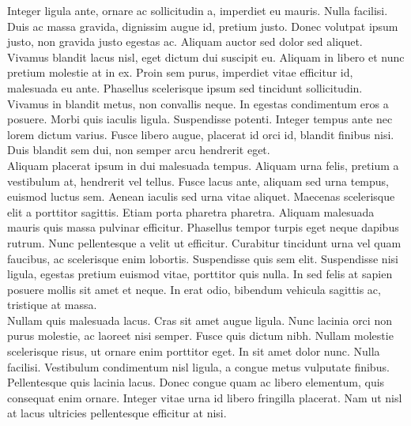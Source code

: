 Integer ligula ante, ornare ac sollicitudin a, imperdiet eu mauris. Nulla facilisi. Duis ac massa gravida, dignissim augue id, pretium justo. Donec volutpat ipsum justo, non gravida justo egestas ac. Aliquam auctor sed dolor sed aliquet. Vivamus blandit lacus nisl, eget dictum dui suscipit eu. Aliquam in libero et nunc pretium molestie at in ex. Proin sem purus, imperdiet vitae efficitur id, malesuada eu ante. Phasellus scelerisque ipsum sed tincidunt sollicitudin. Vivamus in blandit metus, non convallis neque. In egestas condimentum eros a posuere. Morbi quis iaculis ligula. Suspendisse potenti. Integer tempus ante nec lorem dictum varius. Fusce libero augue, placerat id orci id, blandit finibus nisi. Duis blandit sem dui, non semper arcu hendrerit eget. \\

Aliquam placerat ipsum in dui malesuada tempus. Aliquam urna felis, pretium a vestibulum at, hendrerit vel tellus. Fusce lacus ante, aliquam sed urna tempus, euismod luctus sem. Aenean iaculis sed urna vitae aliquet. Maecenas scelerisque elit a porttitor sagittis. Etiam porta pharetra pharetra. Aliquam malesuada mauris quis massa pulvinar efficitur. Phasellus tempor turpis eget neque dapibus rutrum. Nunc pellentesque a velit ut efficitur. Curabitur tincidunt urna vel quam faucibus, ac scelerisque enim lobortis. Suspendisse quis sem elit. Suspendisse nisi ligula, egestas pretium euismod vitae, porttitor quis nulla. In sed felis at sapien posuere mollis sit amet et neque. In erat odio, bibendum vehicula sagittis ac, tristique at massa. \\

Nullam quis malesuada lacus. Cras sit amet augue ligula. Nunc lacinia orci non purus molestie, ac laoreet nisi semper. Fusce quis dictum nibh. Nullam molestie scelerisque risus, ut ornare enim porttitor eget. In sit amet dolor nunc. Nulla facilisi. Vestibulum condimentum nisl ligula, a congue metus vulputate finibus. Pellentesque quis lacinia lacus. Donec congue quam ac libero elementum, quis consequat enim ornare. Integer vitae urna id libero fringilla placerat. Nam ut nisl at lacus ultricies pellentesque efficitur at nisi.
